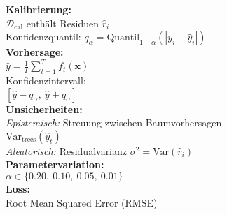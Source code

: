 \begin{center}
\begin{minipage}[t]{0.48\textwidth}
\textbf{Kalibrierung:} \\ 
$\mathcal{D}_{\text{cal}}$ enthält Residuen $\hat{r}_i$ \\ 
Konfidenzquantil: $q_\alpha = \text{Quantil}_{1-\alpha}(|y_i - \hat{y}_i|)$ \\[4pt]

\textbf{Vorhersage:} \\ 
$\hat{y} = \frac{1}{T} \sum_{t=1}^T f_t(\mathbf{x})$ \\ 
Konfidenzintervall: \\
$[\hat{y} - q_\alpha,\ \hat{y} + q_\alpha]$ \\[4pt]

\textbf{Unsicherheiten:} \\ 
\textit{Epistemisch:} Streuung zwischen Baumvorhersagen \\ 
$\text{Var}_\text{trees}(\hat{y}_t)$ \\ 
\textit{Aleatorisch:} Residualvarianz $\sigma^2 = \text{Var}(\hat{r}_i)$ \\[4pt]

\textbf{Parametervariation:} \\ 
$\alpha \in \{0.20,\ 0.10,\ 0.05,\ 0.01\}$ \\[4pt]

\textbf{Loss:} \\ 
Root Mean Squared Error (RMSE)
\end{minipage}
\end{center}









%
%
%
%
%
%
%
%



